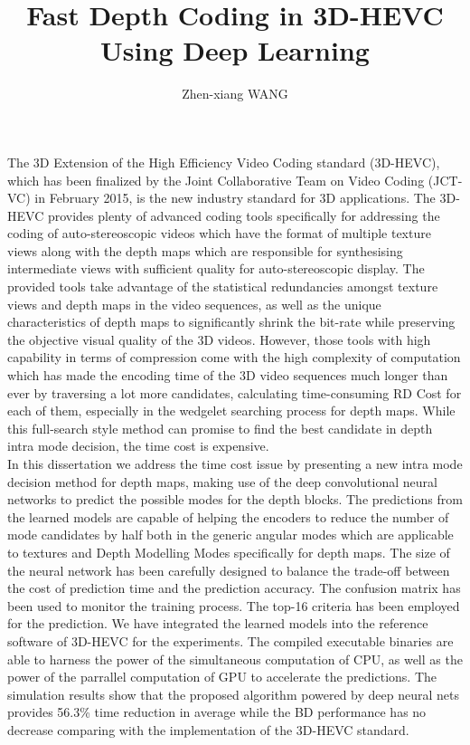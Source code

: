 \documentclass{report}
\begin{document}
    \title{Fast Depth Coding in 3D-HEVC\\
    Using Deep Learning}
    \author{Zhen-xiang WANG}
    \beforepreface
    The 3D Extension of the High Efficiency Video Coding standard (3D-HEVC),
    which has been finalized by the Joint Collaborative Team on Video Coding
    (JCT-VC) in February 2015, is the new industry standard for 3D applications.
    The 3D-HEVC provides plenty of advanced coding tools specifically
    for addressing the coding of auto-stereoscopic videos which have the format
    of multiple texture views along with the depth maps which are responsible
    for synthesising intermediate views with sufficient quality for
    auto-stereoscopic display.
    The provided tools take advantage of the statistical redundancies amongst
    texture views and depth maps in the video sequences, as well as the unique
    characteristics of depth maps to significantly shrink the bit-rate
    while preserving the objective visual quality of the
    3D videos.
    However, those tools with high capability in terms of compression come
    with the high complexity of computation which has made the encoding time
    of the 3D video sequences much longer than ever by traversing a lot more
    candidates, calculating time-consuming RD Cost for each of them,
    especially in the wedgelet searching process for depth maps.
    While this full-search style method can promise to find the best
    candidate in depth intra mode decision, the time cost is expensive.\\
    \newline
    In this dissertation we address the time cost issue by presenting a new
    intra mode decision method for depth maps, making use of the deep
    convolutional neural networks to predict the possible modes for the
    depth blocks.
    The predictions from the learned models are capable of
    helping the encoders to reduce the number of mode candidates by half
    both in the generic angular modes which are applicable to textures
    and Depth Modelling Modes specifically for depth maps.
    The size of the neural network has been carefully designed to balance
    the trade-off between the cost of prediction time and the prediction
    accuracy.
    The confusion matrix has been used to monitor the training process.
    The top-16 criteria has been employed for the prediction.
    We have integrated the learned models into the reference software of
    3D-HEVC for the experiments.
    The compiled executable binaries are able to harness
    the power of the simultaneous computation of CPU, as well as the power of
    the parrallel computation of GPU to accelerate the predictions.
    The simulation results show that the proposed algorithm powered by
    deep neural nets provides 56.3\% time reduction in average while the
    BD performance has no decrease comparing with the implementation of
    the 3D-HEVC standard.
\end{document}
